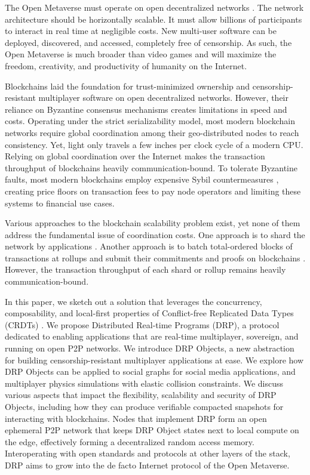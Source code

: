 \documentclass{article}
\begin{document}
The Open Metaverse must operate on open decentralized networks \cite{SIGGRAPH}. The network architecture should be horizontally scalable. It must allow billions of participants to interact in real time at negligible costs. New multi-user software can be deployed, discovered, and accessed, completely free of censorship. As such, the Open Metaverse is much broader than video games and will maximize the freedom, creativity, and productivity of humanity on the Internet.

Blockchains laid the foundation for trust-minimized ownership and censorship-resistant multiplayer software on open decentralized networks. However, their reliance on Byzantine consensus mechanisms creates limitations in speed and costs. Operating under the strict serializability model, most modern blockchain networks require global coordination among their geo-distributed nodes to reach consistency. Yet, light only travels a few inches per clock cycle of a modern CPU. Relying on global coordination over the Internet makes the transaction throughput of blockchains heavily communication-bound. To tolerate Byzantine faults, most modern blockchains employ expensive Sybil countermeasures \cite{Tendermint,Casper}, creating price floors on transaction fees to pay node operators and limiting these systems to financial use cases.

Various approaches to the blockchain scalability problem exist, yet none of them address the fundamental issue of coordination costs. One approach is to shard the network by applications \cite{Cosmos, RGB}. Another approach is to batch total-ordered blocks of transactions at rollups and submit their commitments and proofs on blockchains \cite{Rollup}. However, the transaction throughput of each shard or rollup remains heavily communication-bound.

In this paper, we sketch out a solution that leverages the concurrency, composability, and local-first \cite{LoFi} properties of Conflict-free Replicated Data Types (CRDTs) \cite{CRDT}. We propose Distributed Real-time Programs (DRP), a protocol dedicated to enabling applications that are real-time multiplayer, sovereign, and running on open P2P networks. We introduce DRP Objects, a new abstraction for building censorship-resistant multiplayer applications at ease. We explore how DRP Objects can be applied to social graphs for social media applications, and multiplayer physics simulations with elastic collision constraints. We discuss various aspects that impact the flexibility, scalability and security of DRP Objects, including how they can produce verifiable compacted snapshots for interacting with blockchains. Nodes that implement DRP form an open ephemeral P2P network that keeps DRP Object states next to local compute on the edge, effectively forming a decentralized random access memory. Interoperating with open standards and protocols at other layers of the stack, DRP aims to grow into the de facto Internet protocol of the Open Metaverse.
\end{document}
